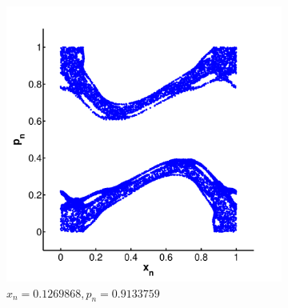\begin{figure}
	\begin{subfigure}{0.9\columnwidth}
		\centering
		\includegraphics[width=\textwidth]{./img/assignment_a_2_dim}
		\caption{$x_n = \num{0.1269868}, p_n = \num{0.9133759}$}
		\label{fig:experiment:dimension:two}
	\end{subfigure}
	\caption{}
	\label{fig:experiment:dimension}
\end{figure}
